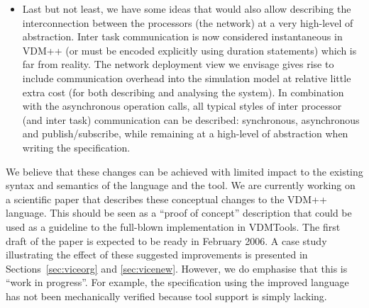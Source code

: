 \begin{itemize}
\item Last but not least, we have some ideas that would also allow
describing the interconnection between the processors (the network) at
a very high-level of abstraction. Inter task communication is now considered
instantaneous in VDM++ (or must be encoded explicitly using duration
statements) which is far from reality. The network deployment view we
envisage gives rise to include communication overhead into the simulation
model at relative little extra cost (for both describing and analysing the
system). In combination with the asynchronous operation calls, all typical
styles of inter processor (and inter task) communication can be described:
synchronous, asynchronous and publish/subscribe, while remaining at a
high-level of abstraction when writing the specification.

\end{itemize}

We believe that these changes can be achieved with limited impact to the
existing syntax and semantics of the language and the tool. We are currently
working on a scientific paper that describes these conceptual changes to the
VDM++ language. This should be seen as a ``proof of concept'' description
that could be used as a guideline to the full-blown implementation in
VDMTools. The first draft of the paper is expected to be ready in
February 2006. A case study illustrating the effect of these suggested
improvements is presented in Sections~\ref{sec:viceorg} and \ref{sec:vicenew}.
However, we do emphasise that this is ``work in progress''. For example,
the specification using the improved language has not been mechanically
verified because tool support is simply lacking.

